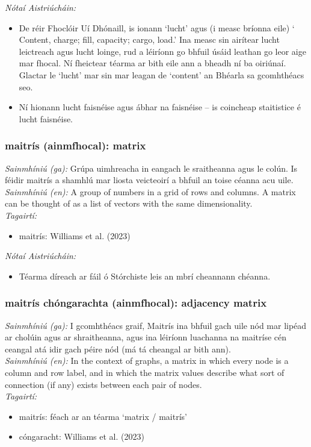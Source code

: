  \noindent \textit{Nótaí Aistriúcháin:}
\begin{itemize}
	\item De réir Fhoclóir Uí Dhónaill, is ionann `lucht' agus (i measc bríonna eile) ` Content, charge; fill, capacity; cargo, load.' Ina measc sin airítear lucht leictreach agus lucht loinge, rud a léiríonn go bhfuil úsáid leathan go leor aige mar fhocal. Ní fheictear téarma ar bith eile ann a bheadh ní ba oiriúnaí. Glactar le `lucht' mar sin mar leagan de `content' an Bhéarla sa gcomhthéacs seo.
	\item Ní hionann lucht faisnéise agus ábhar na faisnéise -- is coincheap staitistice é lucht faisnéise.
\end{itemize}


\subsubsection*{maitrís (ainmfhocal): matrix}
 \noindent \textit{Sainmhíniú (ga):} Grúpa uimhreacha in eangach le sraitheanna agus le colún. Is féidir maitrís a shamhlú mar liosta veicteoirí a bhfuil an toise céanna acu uile.
\\
 \noindent \textit{Sainmhíniú (en):} A group of numbers in a grid of rows and columns. A matrix can be thought of as a list of vectors with the same dimensionality.
\\
 \noindent \textit{Tagairtí:}
\begin{itemize}
	\item maitrís: Williams et al. (2023) \cite{storchiste}
\end{itemize}

 \noindent \textit{Nótaí Aistriúcháin:}
\begin{itemize}
	\item Téarma díreach ar fáil ó Stórchiste leis an mbrí cheannann chéanna.
\end{itemize}


\subsubsection*{maitrís chóngarachta (ainmfhocal): adjacency matrix}
 \noindent \textit{Sainmhíniú (ga):} I gcomhthéacs graif, Maitrís ina bhfuil gach uile nód mar lipéad ar cholúin agus ar shraitheanna, agus ina léiríonn luachanna na maitríse cén ceangal atá idir gach péire nód (má tá cheangal ar bith ann).
\\
 \noindent \textit{Sainmhíniú (en):} In the context of graphs, a matrix in which every node is a column and row label, and in which the matrix values describe what sort of connection (if any) exists between each pair of nodes. 
\\
 \noindent \textit{Tagairtí:}
\begin{itemize}
	\item maitrís: féach ar an téarma `matrix / maitrís'
	\item cóngaracht: Williams et al. (2023) \cite{storchiste}
\end{itemize}

